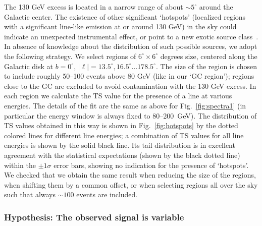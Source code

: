 \documentclass[aps,twocolumn,prd,superscriptaddress,showpacs,nofootinbib,fixfloat]{revtex4}
\begin{document}
The 130 GeV excess is located in a narrow range of about $\sim5^\circ$ around
the Galactic center. The existence of other significant `hotspots' (localized
regions with a significant line-like emission at or around 130 GeV) in the sky
could indicate an unexpected instrumental effect, or point to a new exotic
source class~\cite{Boyarsky:2012ca}. 
In absence of knowledge about the distribution of such possible
sources, we adopt the following strategy. We select regions of
$6^\circ\times6^\circ$ degrees size, centered along the Galactic disk at
$b=0^\circ$, $|\ell|=13.5^\circ, 16.5^\circ \dots 178.5^\circ$. The size of
the region is chosen to include roughly 50--100 events above 80 GeV (like in our `GC
region'); regions close to the GC are excluded to avoid contamination with the
130 GeV excess. In each region we calculate the TS value for the presence of
a line at various energies. The details of the fit are the same as above for
Fig.~\ref{fig:spectra1} (in particular the energy window is always fixed to
80--200~GeV). The distribution of TS values obtained in this way is
shown in Fig.~\ref{fig:hotspots} by the dotted colored lines for different
line energies; a combination of
TS values for all line energies is shown by the solid black line. Its tail
distribution is in excellent agreement with the statistical expectations
(shown by the black dotted line) within the $\pm1\sigma$ error bars, showing
no indication for the presence of `hotspots'. We
checked that we obtain the same result when reducing the size of the regions,
when shifting them by a common offset, or when selecting regions all over the
sky such that always $\sim100$ events are included. 

\subsubsection{Hypothesis: The observed signal is variable}
\end{document}
